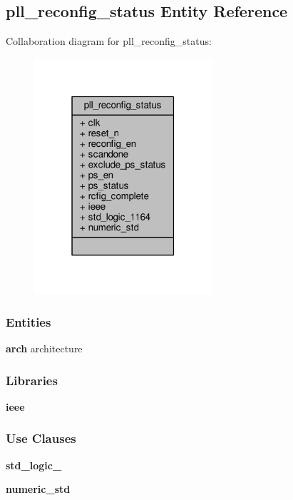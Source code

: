 \subsection{pll\+\_\+reconfig\+\_\+status Entity Reference}
\label{classpll__reconfig__status}


Collaboration diagram for pll\+\_\+reconfig\+\_\+status\+:\nopagebreak
\begin{figure}[H]
\begin{center}
\leavevmode
\includegraphics[width=187pt]{d8/de6/classpll__reconfig__status__coll__graph}
\end{center}
\end{figure}
\subsubsection*{Entities}
\begin{DoxyCompactItemize}
\item 
{\bf arch} architecture
\end{DoxyCompactItemize}
\subsubsection*{Libraries}
 \begin{DoxyCompactItemize}
\item 
{\bf ieee} 
\end{DoxyCompactItemize}
\subsubsection*{Use Clauses}
 \begin{DoxyCompactItemize}
\item 
{\bf std\+\_\+logic\+\_}   
\item 
{\bf numeric\+\_\+std}   
\end{DoxyCompactItemize}
